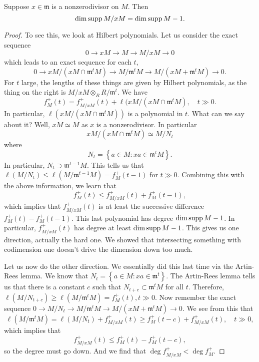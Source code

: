\begin{proposition} \label{dimdropsbyone}
Suppose $x \in \mathfrak{m}$ is a nonzerodivisor on $M$. Then 
\[ \mathrm{dim} \operatorname{supp} M/xM = \mathrm{dim} \operatorname{supp} M - 1.  \]
\end{proposition} 
\begin{proof} 
To see this, we look at Hilbert polynomials. Let us consider the exact sequence
\[ 0 \to xM \to M \to M/xM \to 0  \]
which leads to an exact sequence for each $t$,
\[ 0 \to xM/(xM \cap \mathfrak{m}^t M) \to M/\mathfrak{m}^t M \to M/(xM  +
\mathfrak{m}^t M) \to 0 . \]
For $t$ large, the lengths of these things are given by Hilbert polynomials,
as the thing on the right is $M/xM \otimes_R R/\mathfrak{m}^t$. 
We have
\[ f_M^+(t) = f_{M/xM}^+(t) + \ell(xM/ (x M \cap \mathfrak{m}^t M), \quad t
\gg 0.  \]
In particular, $\ell( xM/ (xM \cap \mathfrak{m}^t M))$ is a polynomial in $t$.
What can we say about it? Well, $xM \simeq M$ as $x$ is a nonzerodivisor. In
particular
\[ xM / (xM \cap \mathfrak{m}^t M) \simeq M/N_t  \]
where
\[ N_t = \left\{a \in M: xa \in \mathfrak{m}^t M\right\} . \]
In particular, $N_t \supset \mathfrak{m}^{t-1} M$. This tells us that
$\ell(M/N_t) \leq \ell(M/\mathfrak{m}^{t-1} M) = f_M^+(t-1)$ for $t \gg 0$.
Combining this with the above information, we learn that
\[ f_M^+(t) \leq f_{M/xM}^+(t) + f_M^+(t-1),   \]
which implies that $f_{M/xM}^+(t)$ is at least the successive difference
$f_M^+(t) - f_M^+(t-1)$. This last polynomial has degree $\mathrm{dim} \operatorname{supp} M -1$. In
particular, $f_{M/xM}^+(t)$ has degree at least $\mathrm{dim} \operatorname{supp} M -1 $. This gives
us one direction, actually the hard one. We showed that intersecting something with codimension one
doesn't drive the dimension down too much. 

Let us now do the other direction. We essentially did this last time via the
Artin-Rees lemma. We know that $N_t = \left\{a \in M: xa \in
\mathfrak{m}^t\right\}$. The Artin-Rees lemma tells us that there is a constant
$c$ such that $N_{t+c} \subset \mathfrak{m}^t M$ for all $t$. Therefore,
$\ell(M/N_{t+c}) \geq \ell(M/\mathfrak{m}^t M) = f_M^+(t), t \gg 0$. Now
remember the exact sequence $0 \to M/N_t \to M/\mathfrak{m}^t M \to M/(xM +
\mathfrak{m}^t M) \to 0$. We see from this that
\[ \ell(M/ \mathfrak{m}^t M) = \ell(M/N_t) + f_{M/xM}^+(t) \geq f_M^+(t-c) +
f_{M/xM}^+(t), \quad t \gg 0,  \]
which implies that
\[ f_{M/xM}^+(t) \leq f_M^+(t) - f_M^+(t-c),  \]
so the degree must go down. And we find that $\deg f_{M/xM}^+ < \deg f_{M}^+$.
\end{proof} 

